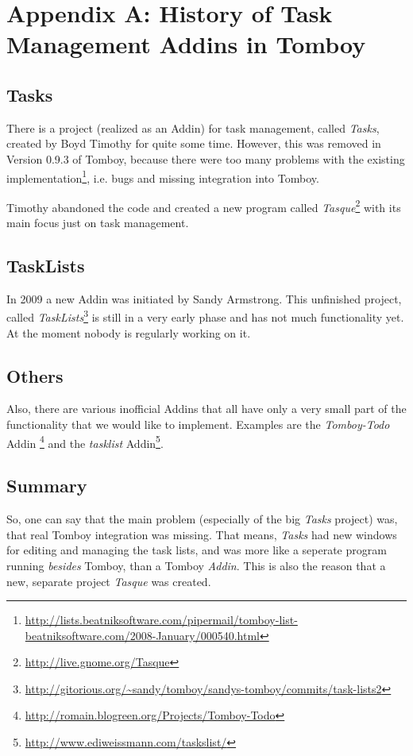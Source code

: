 \clearpage
\appendix
\section{Appendix A: History of Task Management Addins in Tomboy}

\label{appendix:history}
\subsection{Tasks}
There is a project (realized as an Addin) for task management, called \textit{Tasks}, created by Boyd Timothy for quite some time. However, this was removed in Version 0.9.3 of Tomboy, because there were too many problems with the existing implementation\footnote{\url{http://lists.beatniksoftware.com/pipermail/tomboy-list-beatniksoftware.com/2008-January/000540.html}}, i.e. bugs and missing integration into Tomboy.

Timothy abandoned the code and created a new program called \textit{Tasque}\footnote{\url{http://live.gnome.org/Tasque}} with its main focus just on task management.

\subsection{TaskLists}
In 2009 a new Addin was initiated by Sandy Armstrong. This unfinished project, called \textit{TaskLists}\footnote{\url{http://gitorious.org/~sandy/tomboy/sandys-tomboy/commits/task-lists2}} is still in a very early phase and has not much functionality yet. At the moment nobody is regularly working on it.

\subsection{Others}
Also, there are various inofficial Addins that all have only a very small part of the functionality that we would like to implement. Examples are the \textit{Tomboy-Todo} Addin \footnote{\url{http://romain.blogreen.org/Projects/Tomboy-Todo}} and the \textit{tasklist} Addin\footnote{\url{http://www.ediweissmann.com/taskslist/}}.

\subsection{Summary}
\label{lessons}
So, one can say that the main problem (especially of the big \textit{Tasks} project) was, that real Tomboy integration was missing. That means, \textit{Tasks} had new windows for editing and managing the task lists, and was more like a seperate program running \textit{besides} Tomboy, than a Tomboy \textit{Addin}. This is also the reason that a new, separate project \textit{Tasque} was created.
